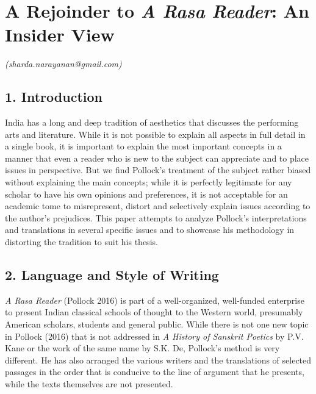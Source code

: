 
\chapter{\hspace{2.1cm} A Rejoinder to \textit{A Rasa Reader}: \hfill\break An Insider View}\label{chapter9}



\begin{flushright}
\textit{(sharda.narayanan@gmail.com)}
\end{flushright}


\section*{1. Introduction}

India has a long and deep tradition of aesthetics that discusses the performing arts and literature. While it is not possible to explain all aspects in full detail in a single book, it is important to explain the most important concepts in a manner that even a reader who is new to the subject can appreciate and to place issues in perspective. But we find Pollock’s treatment of the subject rather biased without explaining the main concepts; while it is perfectly legitimate for any scholar to have his own opinions and preferences, it is not acceptable for an academic tome to misrepresent, distort and selectively explain issues according to the author’s prejudices. This paper attempts to analyze Pollock’s interpretations and translations in several specific issues and to showcase his methodology in distorting the tradition to suit his thesis.


\section*{2. Language and Style of Writing}

\textit{A Rasa Reader} (Pollock 2016) is part of a well-organized, well-funded enterprise to present Indian classical schools of thought to the Western world, presumably American scholars, students and general public. While there is not one new topic in Pollock (2016) that is not addressed in \textit{A History of Sanskrit Poetics} by P.V. Kane or the work of the same name by S.K. De, Pollock’s method is very different. He has also arranged the various writers and the translations of selected passages in the order that is conducive to the line of argument that he presents, while the texts themselves are not presented.

